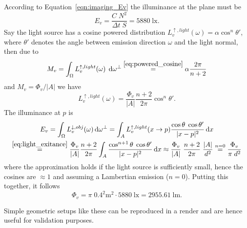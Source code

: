 According to Equation~\eqref{eqn:imaging_Ev} the illuminance at the plane must be 
\begin{displaymath}
  E_v = \frac{C\;N^2}{\Delta t\; S} = 5880\; \si{\lux}.
\end{displaymath}
Say the light source has a cosine powered distribution
$L_v^{\uparrow,light}(\omega) = \alpha \cos^n \theta'$, where
$\theta'$ denotes the angle between emission direction $\omega$ and
the light normal, then due to
\begin{displaymath}
  M_v = \int_\Omega L_v^{\uparrow,light}(\omega) \; \mathop{}\!\mathrm{d} \omega^\bot \stackrel{\eqref{eq:powered_cosine}}= \alpha \frac{2\pi}{n+2}
\end{displaymath}
and $M_v = \Phi_v / |A|$
we have
\begin{equation}\label{eq:light_exitance}
  L_v^{\uparrow,light}(\omega) = \frac{\Phi_v}{|A|} \frac{n+2}{2\pi} \cos^n \theta'.
\end{equation}
The illuminance at $p$ is
\begin{multline*}
  E_v = \int_\Omega L_v^{\downarrow,obj}(\omega) \mathop{}\!\mathrm{d}\omega^{\bot} = \int_A L_v^{\uparrow,light}(x\to p) \frac{\cos \theta\; \cos \theta'}{|x-p|^2} \mathop{}\!\mathrm{d} x \\
  \stackrel{\eqref{eq:light_exitance}} =  \frac{\Phi_v}{|A|} \frac{n+2}{2\pi} \int_A  \frac{\cos^{n+1} \theta\; \cos \theta'}{|x-p|^2} \mathop{}\!\mathrm{d} x
  \approx \frac{ \Phi_v }{|A|}\; \frac{n+2}{2\pi}\; \frac{|A|}{d^2} \stackrel{n=0}= \frac{\Phi_v}{\pi\;d^2}
\end{multline*}
where the approximation holds if the light source is sufficiently small, hence the cosines are $\approx 1$ and assuming a Lambertian emission ($n=0$).
Putting this together, it follows 
\begin{displaymath}
  \Phi_v = \pi \; 0.4^2 \si{\square\meter}\cdot 5880\; \si{\lux} = 2955.61\; \si{\lumen}.
\end{displaymath}

Simple geometric setups like these can be reproduced in a render and are hence useful for validation purposes.
